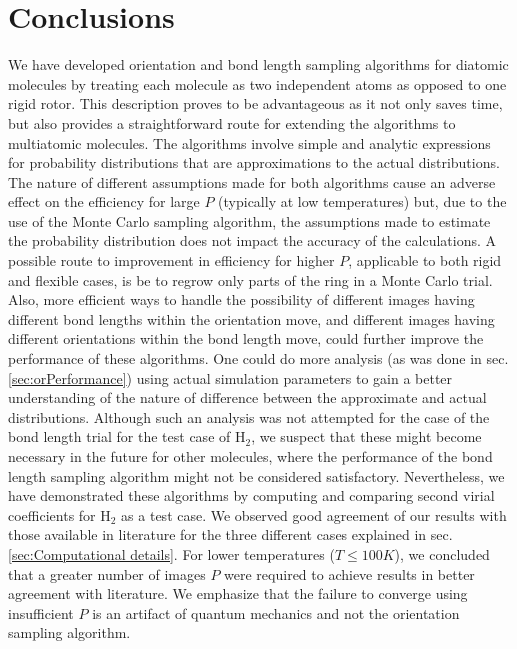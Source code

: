     \section{Conclusions}
        \label{sec:Conclusions and future work}
        We have developed orientation and bond length sampling algorithms for diatomic molecules by treating each molecule as two independent atoms as opposed to one rigid rotor. This description proves to be advantageous as it not only saves time, but also provides a straightforward route for extending the algorithms to multiatomic molecules. The algorithms involve simple and analytic expressions for probability distributions that are approximations to the actual distributions. The nature of different assumptions made for both algorithms cause an adverse effect on the efficiency for large $P$ (typically at low temperatures) but, due to the use of the Monte Carlo sampling algorithm, the assumptions made to estimate the probability distribution does not impact the accuracy of the calculations. A possible route to improvement in efficiency for higher $P$, applicable to both rigid and flexible cases, is be to regrow only parts of the ring in a Monte Carlo trial. Also, more efficient ways to handle the possibility of different images having different bond lengths within the orientation move, and different images having different orientations within the bond length move, could further improve the performance of these algorithms. One could do more analysis (as was done in sec. \ref{sec:orPerformance}) using actual simulation parameters to gain a better understanding of the nature of difference between the approximate and actual distributions. Although such an analysis was not attempted for the case of the bond length trial for the test case of H$_2$, we suspect that these might become necessary in the future for other molecules, where the performance of the bond length sampling algorithm might not be considered satisfactory. Nevertheless, we have demonstrated these algorithms by computing and comparing second virial coefficients for H$_2$ as a test case. We observed good agreement of our results with those available in literature for the three different cases explained in sec. \ref{sec:Computational details}. For lower temperatures ($T \le 100 K$), we concluded that a greater number of images $P$ were required to achieve results in better agreement with literature. We emphasize that the failure to converge using insufficient $P$ is an artifact of quantum mechanics and not the orientation sampling algorithm.
